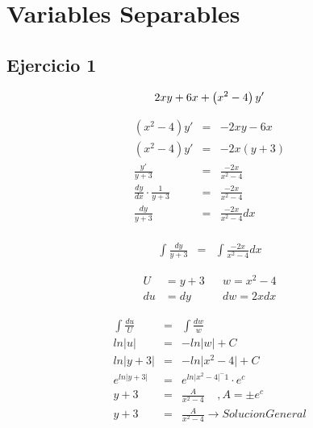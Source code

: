 \documentclass{article}
\begin{document}
\section{Variables Separables}

\subsection{Ejercicio 1}



\begin{equation}
2xy + 6x + \left(x^2-4 \right) y' \\
\end{equation}

\begin{eqnarray}
\nonumber \left( x^2 -4 \right) y' &=& -2xy-6x\\
\nonumber \left( x^2-4 \right)y' &=& -2x\left( y+3 \right)\\   
\nonumber \frac{y'}{y+3}  &=& \frac{-2x}{x^2-4} \\
\nonumber \frac{dy}{dx} \cdot \frac{1}{y+3} &=&  \frac{-2x}{x^2-4} \\
\nonumber \frac{dy}{y+3}  &=& \frac{-2x}{x^2-4} dx
\end{eqnarray}
\\
\begin{eqnarray}
\nonumber  \int \frac{dy}{y+3}  &=& \int \frac{-2x}{x^2-4} dx
\end{eqnarray}



\begin{align*}
U &= y + 3	&	 &w = x^2-4 \\
du &= dy 	 &	 &dw = 2xdx
\end{align*}


\begin{eqnarray}
\nonumber \int \frac{du}{U}  &=&  \int \frac{dw}{w} \\
\nonumber ln \lvert u \rvert  &=&  -ln \lvert w \rvert +C \\
\nonumber ln \lvert y+3 \rvert  &=&  -ln \lvert x^2-4 \rvert +C \\
\nonumber e^{ln\lvert y+3 \rvert}  &=&  e^{ln\lvert x^2-4 \rvert ^-1} \cdot e^c \\
\nonumber y+3 &=& \frac{A}{x^2-4}  \ \ \ \ \     , A = \pm e^c \\
\nonumber y+3 &=& \frac{A}{x^2 -4} \rightarrow Solucion General
\end{eqnarray}
\\
\end{document}
